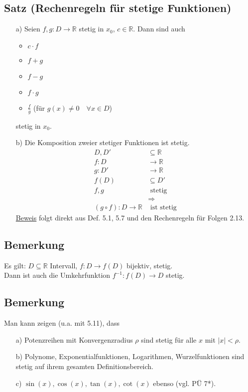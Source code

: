 \documentclass[12pt, titlepage]{article}
\newcommand{\R}{\mathds{R}}
\renewcommand{\>}{\rightarrow}
\renewcommand{\*}{\cdot}
\begin{document}
	\subsection{Satz (Rechenregeln für stetige Funktionen)}
	\begin{itemize}
		\item[a)] Seien $f, g\colon D\>\R$ stetig in $x_0$, $c\in\R$. Dann sind auch
		\begin{itemize}
			\item $c\* f$
			\item $f+g$
			\item $f-g$
			\item $f\* g$
			\item $\frac{f}{g}$ (für $g(x)\neq 0\quad\forall x\in D$)
		\end{itemize}
		stetig in $x_0$.
		\item[b)] Die Komposition zweier stetiger Funktionen ist stetig.
		\begin{align*}
			D,D'&\subseteq\R\\
			f\colon D&\>\R\\
			g\colon D'&\>\R\\
			f(D)&\subseteq D'\\
			f,g&\textrm{ stetig}\\
			&\Rightarrow\\
			(g\circ f)\colon D\>\R&\textrm{ ist stetig}
		\end{align*}
		\underline{Beweis} folgt direkt aus Def. 5.1, 5.7 und den Rechenregeln für Folgen 2.13.
	\end{itemize}
	\subsection{Bemerkung}
	Es gilt: $D\subseteq\R$ Intervall, $f\colon D\> f(D)$ bijektiv, stetig.\\
	Dann ist auch die Umkehrfunktion $f^{-1}\colon f(D)\> D$ stetig.
	\subsection{Bemerkung}
	Man kann zeigen (u.a. mit 5.11), dass
	\begin{itemize}
		\item[a)] Potenzreihen mit Konvergenzradius $\rho$ sind stetig für alle $x$ mit $|x|<\rho$.
		\item[b)] Polynome, Exponentialfunktionen, Logarithmen, Wurzelfunktionen sind stetig auf ihrem gesamten Definitionsbereich.
		\item[c)] $\sin(x), \cos(x), \tan(x), \cot(x)$ ebenso (vgl. PÜ 7*).
	\end{itemize}
\end{document}
